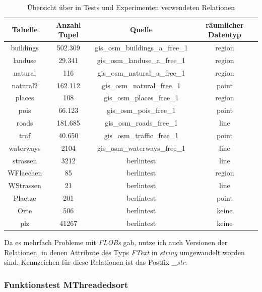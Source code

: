 \documentclass[a4paper,12pt,twoside]{article}
\newcommand{\Fb}[1]{\textit{#1}} %
\begin{document}
\begin{table}
	\centering
\begin{tabular}{|c|c|c|c|}
	\hline 
	Tabelle & Anzahl Tupel & Quelle & räumlicher Datentyp  \\ 
	\hline 
	buildings & 502.309 & gis\_osm\_buildings\_a\_free\_1 & region \\ 
	\hline 
	landuse & 29.341 & gis\_osm\_landuse\_a\_free\_1 & region \\ 
	\hline 
	natural & 116 & gis\_osm\_natural\_a\_free\_1 & region \\ 
	\hline 
	natural2 & 162.112 & gis\_osm\_natural\_free\_1 & point \\ 
	\hline
	places & 108 & gis\_osm\_places\_free\_1 & region \\ 
	\hline 
	pois & 66.123 & gis\_osm\_pois\_free\_1  & point \\ 
	\hline 
	roads & 181.685 & gis\_osm\_roads\_free\_1 & line \\ 
	\hline
	traf & 40.650 & gis\_osm\_traffic\_free\_1  & point \\ 
	\hline 
	waterways & 2104 & gis\_osm\_waterways\_free\_1 & line \\ 
	\hline
	strassen & 3212 &  berlintest & line \\ 
	\hline
	WFlaechen & 85 &  berlintest & region \\ 
	\hline 
	WStrassen & 21 &  berlintest & line \\ 
	\hline 
	Plaetze & 201 &  berlintest & point \\ 
	\hline 
	Orte & 506 & berlintest & keine \\ 
	\hline
	plz & 41267 & berlintest & keine \\ 
	\hline 
\end{tabular}
\caption{\label{tab:testRel} Übersicht über in Tests und Experimenten verwendeten Relationen}
\end{table}

Da es mehrfach Probleme mit \Fb{FLOBs} gab, nutze ich auch Versionen der Relationen, in denen Attribute des Typs \Fb{FText} in \Fb{string} umgewandelt worden sind. Kennzeichen für diese Relationen ist das Postfix \Fb{\_str}.

\subsubsection{Funktionstest MThreadedsort}
\end{document}
